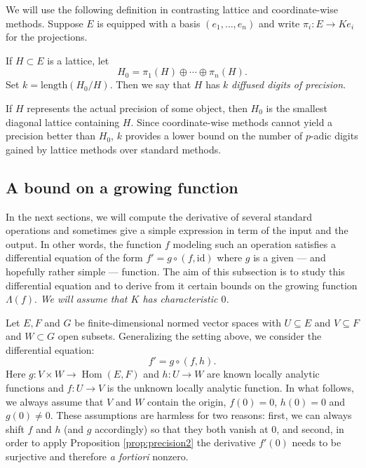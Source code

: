 \documentclass{sig-alternate}
\DeclareMathOperator{\Hom}{Hom}
\newcommand{\id}{\textrm{id}}
\begin{document}
We will use the following definition in contrasting lattice and coordinate-wise methods. 
Suppose $E$ is equipped with a basis $(e_1, \ldots, e_n)$ and write $\pi_i : E \to Ke_i$ for the projections.

\begin{deftn} \label{def:diffused}
If $H \subset E$ is a lattice, let
\[
H_0 = \pi_1(H) \oplus \cdots \oplus \pi_n(H).
\]
Set $k = \text{length}(H_0/H)$.  Then we say that $H$ has $k$
\emph{diffused digits of precision}.
\end{deftn}
If $H$ represents the actual precision of some object, then
$H_0$ is the smallest diagonal lattice containing $H$.  Since
coordinate-wise methods cannot yield a precision better than $H_0$,
$k$ provides a lower bound on the number of $p$-adic digits
gained by lattice methods over standard methods.

\subsection{A bound on a growing function}
\label{ssec:boundLambdaf}

In the next sections, we will compute the derivative of several standard 
operations and sometimes give a simple expression in term 
of the input and the output. In other words, the function $f$ modeling
such an operation satisfies a differential equation of the form
$f' = g \circ (f, \id)$  %
where $g$ is a given --- and hopefully rather simple --- function. The 
aim of this subsection is to study this differential equation and to 
derive from it certain bounds on the growing function $\Lambda(f)$. 
\emph{We will assume that $K$ has 
characteristic $0$.}

Let $E, F$ and $G$ be finite-dimensional normed vector spaces with
$U \subseteq E$ and $V \subseteq F$ and $W \subset G$ open subsets.
Generalizing the setting above, we consider the 
differential equation:
\begin{equation}
\label{eq:diffequah}
f' = g \circ (f, h).
\end{equation}
Here $g : V \times W \to \Hom(E, F)$ and $h : U \to W$ are known
locally analytic functions and $f : U \to V$ is the 
unknown locally analytic function. 
In what follows, we always assume that $V$ and $W$ contain the origin, 
$f(0) = 0$, $h(0) = 0$ and $g(0) \neq 0$. These assumptions are harmless 
for two reasons: first, we can always shift $f$ and $h$ (and $g$ 
accordingly) so that they both vanish at $0$, and second, in order to 
apply Proposition \ref{prop:precision2} the derivative $f'(0)$ 
needs to be surjective and therefore \emph{a fortiori} nonzero.
\end{document}
